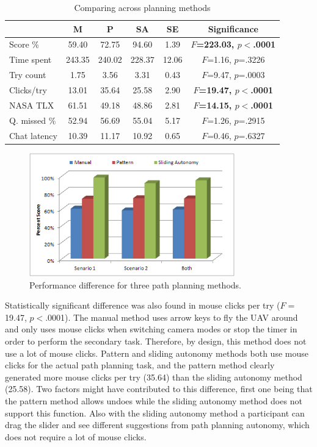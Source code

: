 \documentclass[journal]{IEEEtran}
\begin{document}
\begin{table}
\caption{Comparing across planning methods}
\scriptsize
	\centering
		\begin{tabular}
			{|l|c|c|c|c|c|}
			\hline
			& M & P & SA & SE & Significance \\
			\hline
			Score \% & 59.40 & 72.75 & 94.60 & 1.39 & \textbf{$F$=223.03, $p<$.0001} \\
			Time spent & 243.35 & 240.02 & 228.37 & 12.06 & $F$=1.16, $p$=.3226 \\
			Try count & 1.75 & 3.56 & 3.31 & 0.43 & $F$=9.47, $p$=.0003 \\
			Clicks/try & 13.01 & 35.64 & 25.58 & 2.90 & \textbf{$F$=19.47, $p<$.0001} \\
			NASA TLX & 61.51 & 49.18 & 48.86 & 2.81 & \textbf{$F$=14.15, $p<$.0001} \\
			\hline
			Q. missed \% & 52.94 & 56.69 & 55.04 & 5.17 & $F$=1.26, $p$=.2915 \\
			Chat latency & 10.39 & 11.17 & 10.92 & 0.65 & $F$=0.46, $p$=.6327 \\
			\hline			
		\end{tabular}
\label{AcrossMethods}
\end{table}

\begin{figure}
\centering
\includegraphics[width=3.5in]{PerformanceDifference.JPG}
\caption{Performance difference for three path planning methods.}
\label{PerformanceDifference}
\end{figure}

Statistically significant difference was also found in mouse clicks per try ($F=$19.47, $p<$.0001). The manual method uses arrow keys to fly the UAV around and only uses mouse clicks when switching camera modes or stop the timer in order to perform the secondary task. Therefore, by design, this method does not use a lot of mouse clicks. Pattern and sliding autonomy methods both use mouse clicks for the actual path planning task, and the pattern method clearly generated more mouse clicks per try (35.64) than the sliding autonomy method (25.58). Two factors might have contributed to this difference, first one being that the pattern method allows undoes while the sliding autonomy method does not support this function. Also with the sliding autonomy method a participant can drag the slider and see different suggestions from path planning autonomy, which does not require a lot of mouse clicks.
\end{document}
